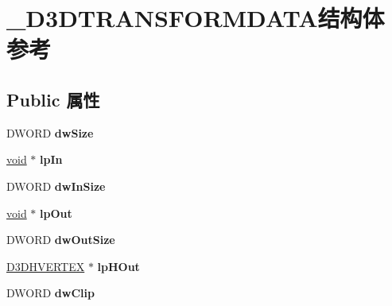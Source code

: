 \hypertarget{struct___d3_d_t_r_a_n_s_f_o_r_m_d_a_t_a}{}\section{\+\_\+\+D3\+D\+T\+R\+A\+N\+S\+F\+O\+R\+M\+D\+A\+T\+A结构体 参考}
\label{struct___d3_d_t_r_a_n_s_f_o_r_m_d_a_t_a}
\subsection*{Public 属性}
\begin{DoxyCompactItemize}
\item 
\mbox{\label{struct___d3_d_t_r_a_n_s_f_o_r_m_d_a_t_a_a48378a2c1d87cfc3cd5d1ae5c0fe1b9c}} 
D\+W\+O\+RD {\bfseries dw\+Size}
\item 
\mbox{\label{struct___d3_d_t_r_a_n_s_f_o_r_m_d_a_t_a_af79c65d3e34d8c344384963237f96729}} 
\hyperlink{interfacevoid}{void} $\ast$ {\bfseries lp\+In}
\item 
\mbox{\label{struct___d3_d_t_r_a_n_s_f_o_r_m_d_a_t_a_afce6ab1dabb7937c76243a6f56fcc82e}} 
D\+W\+O\+RD {\bfseries dw\+In\+Size}
\item 
\mbox{\label{struct___d3_d_t_r_a_n_s_f_o_r_m_d_a_t_a_a943d571e252e3aa5794adb8cb4af3583}} 
\hyperlink{interfacevoid}{void} $\ast$ {\bfseries lp\+Out}
\item 
\mbox{\label{struct___d3_d_t_r_a_n_s_f_o_r_m_d_a_t_a_a501a1dd3a6a5d0b54a53caae3aca5be2}} 
D\+W\+O\+RD {\bfseries dw\+Out\+Size}
\item 
\mbox{\label{struct___d3_d_t_r_a_n_s_f_o_r_m_d_a_t_a_a5f466858bbaa0aeab5846abfa316a15b}} 
\hyperlink{struct___d3_d_h_v_e_r_t_e_x}{D3\+D\+H\+V\+E\+R\+T\+EX} $\ast$ {\bfseries lp\+H\+Out}
\item 
\mbox{\label{struct___d3_d_t_r_a_n_s_f_o_r_m_d_a_t_a_ae0b909eb77c68192e94412c318e78201}} 
D\+W\+O\+RD {\bfseries dw\+Clip}

\end{DoxyCompactItemize}

